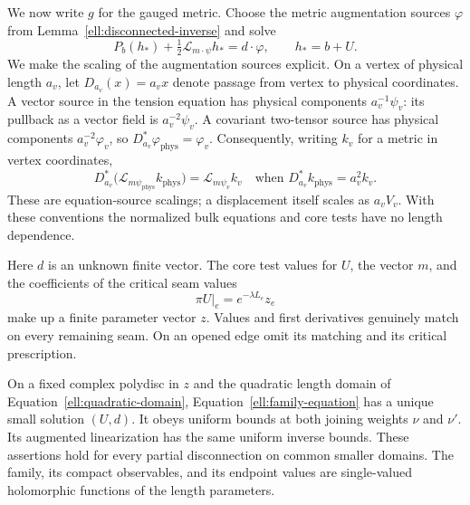 We now write $g$ for the gauged metric.  Choose the metric
augmentation sources $\varphi$ from
Lemma~\ref{ell:disconnected-inverse} and solve
\begin{equation}
 P_b(h_*)+\tfrac12\mathcal L_{m\cdot\psi}h_*=d\cdot\varphi,
 \qquad h_*=b+U.
 \label{ell:family-equation}
\end{equation}
We make the scaling of the augmentation sources explicit. On a
vertex of physical length $a_v$, let $D_{a_v}(x)=a_vx$ denote
passage from vertex to physical coordinates. A vector source in the
tension equation has physical components $a_v^{-1}\psi_v$:
its pullback as a vector field is $a_v^{-2}\psi_v$.
A covariant two-tensor source has physical components
$a_v^{-2}\varphi_v$, so $D_{a_v}^*\varphi_{\mathrm{phys}}=\varphi_v$.
Consequently, writing $k_v$ for a metric in vertex coordinates,
\[
 D_{a_v}^*\bigl(\mathcal L_{m\psi_{\mathrm{phys}}}k_{\mathrm{phys}}\bigr)
       =\mathcal L_{m\psi_v}k_v
 \quad\text{when }D_{a_v}^*k_{\mathrm{phys}}=a_v^2k_v.
\]
These are equation-source scalings; a displacement itself scales as
$a_vV_v$. With these conventions the normalized bulk equations and
core tests have no length dependence.

Here $d$ is an unknown finite vector.  The core test values for
$U$, the vector $m$, and the coefficients of the critical seam
values
\begin{equation}
                  \pi U|_e=e^{-\lambda L_e}z_e
 \label{ell:seam-prescription}
\end{equation}
make up a finite parameter vector $z$.  Values and first
derivatives genuinely match on every remaining seam.  On an
opened edge omit its matching and its critical prescription.

\begin{lemma}
\label{ell:analytic-family}
On a fixed complex polydisc in $z$ and the quadratic length domain
of Equation~\eqref{ell:quadratic-domain},
Equation~\eqref{ell:family-equation} has a unique small solution
$(U,d)$.  It obeys uniform bounds at both joining weights $\nu$
and $\nu'$.  Its augmented linearization has the same uniform
inverse bounds.  These assertions hold for every partial
disconnection on common smaller domains.  The family, its compact
observables, and its endpoint values are single-valued holomorphic
functions of the length parameters.
\end{lemma}


